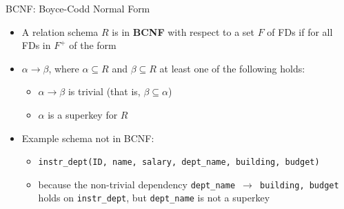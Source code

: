 \documentclass[aspectratio=169, xcolor=dvipsnames]{beamer}
\begin{document}
\begin{frame}{BCNF: Boyce-Codd Normal Form}
    \begin{itemize}[<+->]
        \item A relation schema $R$ is in \textbf{BCNF} with respect to a set $F$ of FDs if for all FDs in $F^+$ of the form
        \item $\alpha \rightarrow \beta$, where $\alpha \subseteq R$ and $\beta \subseteq R$ at least one of the following holds:
        \begin{itemize}
            \item[$\triangleright$] $\alpha \rightarrow \beta$ is trivial (that is, $\beta \subseteq \alpha$)
            \item[$\triangleright$] $\alpha$ is a superkey for $R$
        \end{itemize}
        \item Example schema not in BCNF:
        \begin{itemize}
            \item[$\triangleright$] \texttt{instr\_dept(ID, name, salary, dept\_name, building, budget)}
            \item[$\triangleright$] because the non-trivial dependency \texttt{dept\_name $\rightarrow$ building, budget} holds on \texttt{instr\_dept}, but \texttt{dept\_name} is not a superkey
        \end{itemize}
    \end{itemize}
\end{frame}
\end{document}
